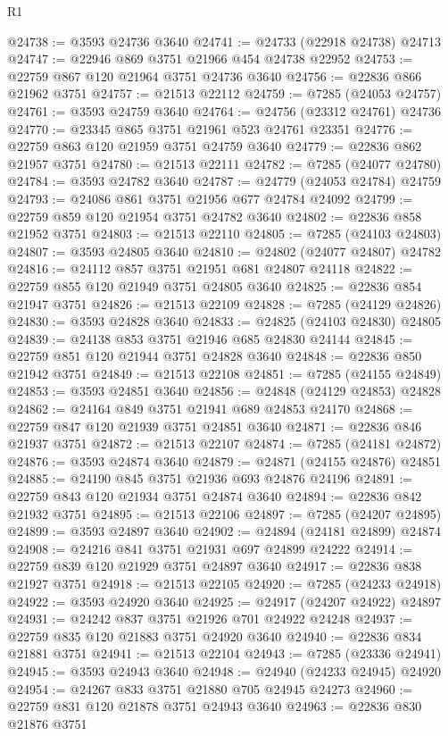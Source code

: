 \begin{lexlean}{R1}
\begin{coremodule}
@24738 := @3593 @24736 @3640
@24741 := @24733 (@22918 @24738) @24713
@24747 := @22946 @869 @3751 @21966 @454 @24738 @22952
@24753 := @22759 @867 @120 @21964 @3751 @24736 @3640
@24756 := @22836 @866 @21962 @3751
@24757 := @21513 @22112
@24759 := @7285 (@24053 @24757)
@24761 := @3593 @24759 @3640
@24764 := @24756 (@23312 @24761) @24736
@24770 := @23345 @865 @3751 @21961 @523 @24761 @23351
@24776 := @22759 @863 @120 @21959 @3751 @24759 @3640
@24779 := @22836 @862 @21957 @3751
@24780 := @21513 @22111
@24782 := @7285 (@24077 @24780)
@24784 := @3593 @24782 @3640
@24787 := @24779 (@24053 @24784) @24759
@24793 := @24086 @861 @3751 @21956 @677 @24784 @24092
@24799 := @22759 @859 @120 @21954 @3751 @24782 @3640
@24802 := @22836 @858 @21952 @3751
@24803 := @21513 @22110
@24805 := @7285 (@24103 @24803)
@24807 := @3593 @24805 @3640
@24810 := @24802 (@24077 @24807) @24782
@24816 := @24112 @857 @3751 @21951 @681 @24807 @24118
@24822 := @22759 @855 @120 @21949 @3751 @24805 @3640
@24825 := @22836 @854 @21947 @3751
@24826 := @21513 @22109
@24828 := @7285 (@24129 @24826)
@24830 := @3593 @24828 @3640
@24833 := @24825 (@24103 @24830) @24805
@24839 := @24138 @853 @3751 @21946 @685 @24830 @24144
@24845 := @22759 @851 @120 @21944 @3751 @24828 @3640
@24848 := @22836 @850 @21942 @3751
@24849 := @21513 @22108
@24851 := @7285 (@24155 @24849)
@24853 := @3593 @24851 @3640
@24856 := @24848 (@24129 @24853) @24828
@24862 := @24164 @849 @3751 @21941 @689 @24853 @24170
@24868 := @22759 @847 @120 @21939 @3751 @24851 @3640
@24871 := @22836 @846 @21937 @3751
@24872 := @21513 @22107
@24874 := @7285 (@24181 @24872)
@24876 := @3593 @24874 @3640
@24879 := @24871 (@24155 @24876) @24851
@24885 := @24190 @845 @3751 @21936 @693 @24876 @24196
@24891 := @22759 @843 @120 @21934 @3751 @24874 @3640
@24894 := @22836 @842 @21932 @3751
@24895 := @21513 @22106
@24897 := @7285 (@24207 @24895)
@24899 := @3593 @24897 @3640
@24902 := @24894 (@24181 @24899) @24874
@24908 := @24216 @841 @3751 @21931 @697 @24899 @24222
@24914 := @22759 @839 @120 @21929 @3751 @24897 @3640
@24917 := @22836 @838 @21927 @3751
@24918 := @21513 @22105
@24920 := @7285 (@24233 @24918)
@24922 := @3593 @24920 @3640
@24925 := @24917 (@24207 @24922) @24897
@24931 := @24242 @837 @3751 @21926 @701 @24922 @24248
@24937 := @22759 @835 @120 @21883 @3751 @24920 @3640
@24940 := @22836 @834 @21881 @3751
@24941 := @21513 @22104
@24943 := @7285 (@23336 @24941)
@24945 := @3593 @24943 @3640
@24948 := @24940 (@24233 @24945) @24920
@24954 := @24267 @833 @3751 @21880 @705 @24945 @24273
@24960 := @22759 @831 @120 @21878 @3751 @24943 @3640
@24963 := @22836 @830 @21876 @3751

\end{coremodule}
\end{lexlean}
